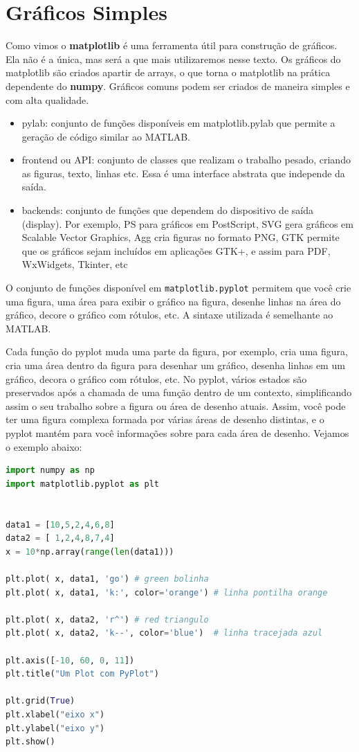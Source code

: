 \section{Gráficos Simples}

Como vimos o {\bf matplotlib} é uma ferramenta útil para construção de gráficos. Ela não é a única, mas será a que mais utilizaremos nesse texto. Os gráficos do matplotlib são criados apartir de arrays, o que torna o matplotlib na prática dependente do {\bf numpy}. Gráficos comuns podem ser criados de maneira simples e com alta qualidade. 

\begin{itemize}
    \item pylab: conjunto de funções disponíveis em matplotlib.pylab que permite a geração de código similar ao MATLAB.
    \item frontend ou API: conjunto de classes que realizam o trabalho pesado, criando as figuras, texto, linhas etc. Essa é uma interface abstrata que independe da saída.
    \item backends: conjunto de funções que dependem do dispositivo de saída (display). Por exemplo, PS para gráficos em PostScript, SVG gera gráficos em Scalable Vector Graphics, Agg cria figuras no formato PNG, GTK permite que os gráficos sejam incluídos em aplicações GTK+, e assim para PDF, WxWidgets, Tkinter, etc
\end{itemize}

O conjunto de funções disponível em {\tt matplotlib.pyplot} permitem que você crie uma figura, uma área para exibir o gráfico na figura, desenhe linhas na área do gráfico, decore o gráfico com rótulos, etc. A sintaxe utilizada é semelhante ao MATLAB.

Cada função do pyplot muda uma parte da figura, por exemplo, cria uma figura, cria uma área dentro da figura para desenhar um gráfico, desenha linhas em um gráfico, decora o gráfico com rótulos, etc. No pyplot, vários estados são preservados após a chamada de uma função dentro de um contexto, simplificando assim o seu trabalho sobre a figura ou área de desenho atuais. Assim, você pode ter uma figura complexa formada por várias áreas de desenho distintas, e o pyplot mantém para você informações sobre para cada área de desenho. Vejamos o exemplo abaixo: 

\begin{lstlisting}[language=Python]
import numpy as np
import matplotlib.pyplot as plt


data1 = [10,5,2,4,6,8]
data2 = [ 1,2,4,8,7,4]
x = 10*np.array(range(len(data1)))

plt.plot( x, data1, 'go') # green bolinha
plt.plot( x, data1, 'k:', color='orange') # linha pontilha orange

plt.plot( x, data2, 'r^') # red triangulo
plt.plot( x, data2, 'k--', color='blue')  # linha tracejada azul

plt.axis([-10, 60, 0, 11])
plt.title("Um Plot com PyPlot")

plt.grid(True)
plt.xlabel("eixo x")
plt.ylabel("eixo y")
plt.show()
\end{lstlisting}


